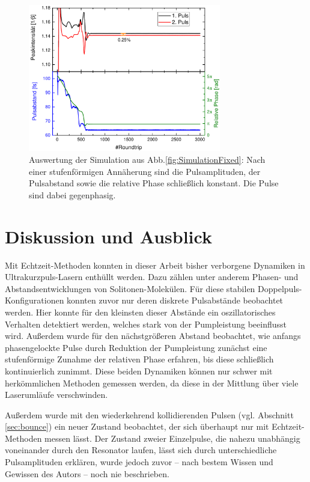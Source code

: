 \documentclass[bachelor,       %
               twoside,        %
               BCOR10mm,       %
               liststotoc,nomtotoc,bibtotoc, %
               english,ngerman, %
               final,          %
               ]{GAUBM}
\begin{document}
\begin{figure}[!htb]
	\centering
	\includegraphics[width=0.75\textwidth]{figures/SimRBFixed}
	\caption{Auswertung der Simulation aus Abb.\ref{fig:SimulationFixed}: Nach einer stufenförmigen Annäherung sind die Pulsamplituden, der Pulsabstand sowie die relative Phase schließlich konstant. Die Pulse sind dabei gegenphasig.}
	\label{fig:SimRBFix}
\end{figure}

\chapter{Diskussion und Ausblick}
Mit Echtzeit-Methoden  konnten in dieser Arbeit bisher verborgene Dynamiken in Ultrakurzpuls-Lasern enthüllt werden.
Dazu zählen unter anderem Phasen- und Abstandsentwicklungen von Solitonen-Molekülen.
Für diese stabilen Doppelpuls-Konfigurationen konnten zuvor nur deren diskrete Pulsabstände beobachtet werden.
Hier konnte für den kleinsten dieser Abstände ein oszillatorisches Verhalten detektiert werden, welches stark von der Pumpleistung beeinflusst wird.
Außerdem wurde für den nächstgrößeren Abstand beobachtet, wie anfangs phasengelockte Pulse durch Reduktion der Pumpleistung zunächst eine stufenförmige Zunahme der relativen Phase erfahren, bis diese schließlich kontinuierlich zunimmt.
Diese beiden Dynamiken können nur schwer mit herkömmlichen Methoden gemessen werden, da diese in der Mittlung über viele Laserumläufe verschwinden.


Außerdem wurde mit den wiederkehrend kollidierenden Pulsen (vgl. Abschnitt \ref{sec:bounce}) ein neuer Zustand beobachtet, der sich überhaupt nur mit Echtzeit-Methoden messen lässt.
Der Zustand zweier Einzelpulse, die nahezu unabhängig voneinander durch den Resonator laufen, lässt sich durch unterschiedliche Pulsamplituden erklären, wurde jedoch zuvor -- nach bestem Wissen und Gewissen des Autors -- noch nie beschrieben.
\end{document}
